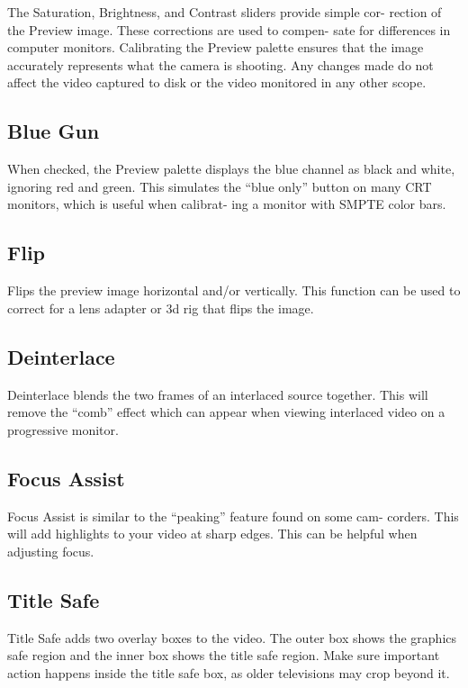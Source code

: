 \documentclass[10,letterpaper,]{report}
\begin{document}
The Saturation, Brightness, and Contrast sliders provide simple cor-
rection of the Preview image. These corrections are used to compen- sate
for differences in computer monitors. Calibrating the Preview palette
ensures that the image accurately represents what the camera is
shooting. Any changes made do not affect the video captured to disk or
the video monitored in any other scope.

\subsection{Blue Gun}

When checked, the Preview palette displays the blue channel as black and
white, ignoring red and green. This simulates the ``blue only'' button
on many CRT monitors, which is useful when calibrat- ing a monitor with
SMPTE color bars.

\subsection{Flip}

Flips the preview image horizontal and/or vertically. This function can
be used to correct for a lens adapter or 3d rig that flips the image.

\subsection{Deinterlace}

Deinterlace blends the two frames of an interlaced source together. This
will remove the ``comb'' effect which can appear when viewing interlaced
video on a progressive monitor.

\subsection{Focus Assist}

Focus Assist is similar to the ``peaking'' feature found on some cam-
corders. This will add highlights to your video at sharp edges. This can
be helpful when adjusting focus.

\subsection{Title Safe}

Title Safe adds two overlay boxes to the video. The outer box shows the
graphics safe region and the inner box shows the title safe region. Make
sure important action happens inside the title safe box, as older
televisions may crop beyond it.
\end{document}
